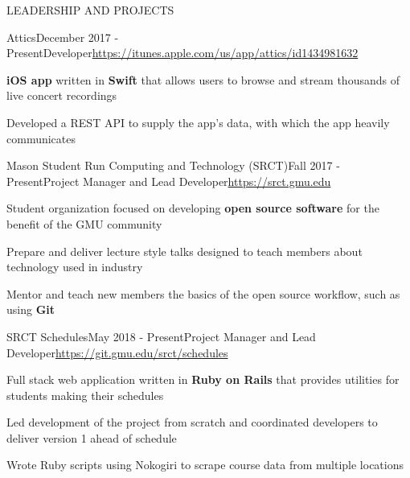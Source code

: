 \documentclass{resume} %
\begin{document}

\begin{rSection}{LEADERSHIP AND PROJECTS}

  \begin{rSubsection}{Attics}{December 2017 - Present}{Developer}{\url{https://itunes.apple.com/us/app/attics/id1434981632}} 

    \item \textbf{iOS app} written in \textbf{Swift} that allows users to browse and stream thousands of live concert recordings
    \item Developed a REST API to supply the app's data, with which the app heavily communicates
    
  \end{rSubsection}

  \begin{rSubsection}{Mason Student Run Computing and Technology (SRCT)}{Fall 2017 - Present}{Project Manager and Lead Developer}{\url{https://srct.gmu.edu}} 

    \item Student organization focused on developing \textbf{open source software} for the benefit of the GMU community
    \item Prepare and deliver lecture style talks designed to teach members about technology used in industry
    \item Mentor and teach new members the basics of the open source workflow, such as using \textbf{Git}
 
  \end{rSubsection}

  \begin{rSubsection}{SRCT Schedules}{May 2018 - Present}{Project Manager and Lead Developer}{\url{https://git.gmu.edu/srct/schedules}} 

    \item Full stack web application written in \textbf{Ruby on Rails} that provides utilities for students making their schedules
    \item Led development of the project from scratch and coordinated developers to deliver version 1 ahead of schedule
    \item Wrote Ruby scripts using Nokogiri to scrape course data from multiple locations
    
  \end{rSubsection}

\end{rSection} 
\end{document}
